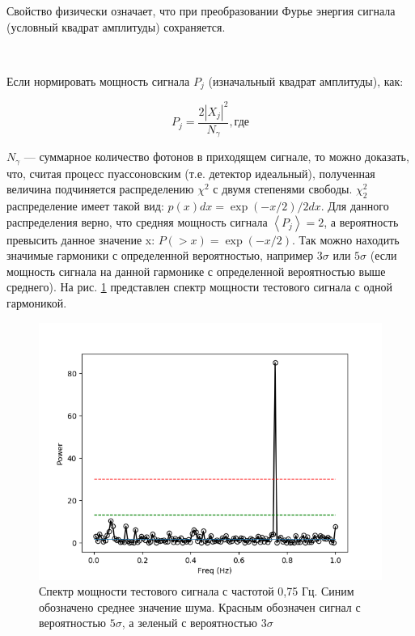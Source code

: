 		Свойство физически означает, что при преобразовании Фурье энергия сигнала (условный квадрат амплитуды) сохраняется.
		
		~
		
		Если нормировать мощность сигнала $P_j$ (изначальный квадрат амплитуды), как:
		
		\begin{equation}
			P_j = \frac{2 | X_j |^2 }{N_{\gamma}}, \text{где}
		\end{equation}
		
		$N_{\gamma}$ --- суммарное количество фотонов в приходящем сигнале, то можно доказать, что, считая процесс пуассоновским (т.е. детектор идеальный), полученная величина подчиняется 
		распределению $\chi^2$ с двумя степенями свободы. $\chi^2_2$ распределение имеет такой вид: $p( x ) d x = \exp( -x / 2 ) / 2 d x$. Для данного распределения верно, что средняя мощность сигнала $\left\langle P_j \right\rangle = 2$, а вероятность превысить данное значение x: $P( > x) = \exp( -x / 2)$. Так можно находить значимые гармоники с определенной вероятностью, например $3\sigma$ или $5\sigma$ (если мощность сигнала на данной гармонике с определенной вероятностью выше среднего). На рис. \ref{img:sp} представлен спектр мощности тестового сигнала с одной гармоникой.
		
	\begin{figure}[h!]
		\centering
		\includegraphics[width = 0.65\linewidth]{pictures/PDS.png}
		\caption{Спектр мощности тестового сигнала с частотой 0{,}75 Гц. Синим обозначено среднее значение шума. Красным обозначен сигнал с вероятностью $5 \sigma$, а зеленый с вероятностью $3 \sigma$}
		\label{img:sp}
	\end{figure}

